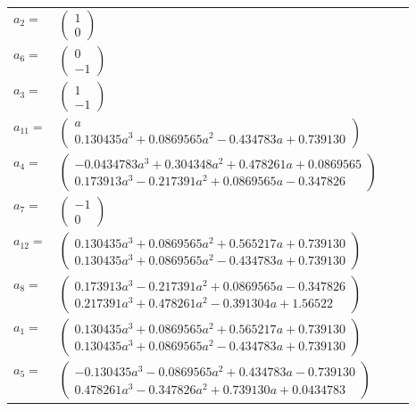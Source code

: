 \documentclass[1p]{elsarticle_modified}
\theoremstyle{definition}
\begin{document}
\begin{tabular}{m{7pt} m{180pt} m{7pt} m{180pt} }
\flushright $a_{2}=$&$\begin{pmatrix}1\\0\end{pmatrix}$ \\
\flushright $a_{6}=$&$\begin{pmatrix}0\\-1\end{pmatrix}$ \\
\flushright $a_{3}=$&$\begin{pmatrix}1\\-1\end{pmatrix}$ \\
\flushright $a_{11}=$&$\begin{pmatrix}a\\0.130435 a^{3}+0.0869565 a^{2}-0.434783 a+0.739130\end{pmatrix}$ \\
\flushright $a_{4}=$&$\begin{pmatrix}-0.0434783 a^{3}+0.304348 a^{2}+0.478261 a+0.0869565\\0.173913 a^{3}-0.217391 a^{2}+0.0869565 a-0.347826\end{pmatrix}$ \\
\flushright $a_{7}=$&$\begin{pmatrix}-1\\0\end{pmatrix}$ \\
\flushright $a_{12}=$&$\begin{pmatrix}0.130435 a^{3}+0.0869565 a^{2}+0.565217 a+0.739130\\0.130435 a^{3}+0.0869565 a^{2}-0.434783 a+0.739130\end{pmatrix}$ \\
\flushright $a_{8}=$&$\begin{pmatrix}0.173913 a^{3}-0.217391 a^{2}+0.0869565 a-0.347826\\0.217391 a^{3}+0.478261 a^{2}-0.391304 a+1.56522\end{pmatrix}$ \\
\flushright $a_{1}=$&$\begin{pmatrix}0.130435 a^{3}+0.0869565 a^{2}+0.565217 a+0.739130\\0.130435 a^{3}+0.0869565 a^{2}-0.434783 a+0.739130\end{pmatrix}$ \\
\flushright $a_{5}=$&$\begin{pmatrix}-0.130435 a^{3}-0.0869565 a^{2}+0.434783 a-0.739130\\0.478261 a^{3}-0.347826 a^{2}+0.739130 a+0.0434783\end{pmatrix}$ \\

\end{tabular}
\end{document}
